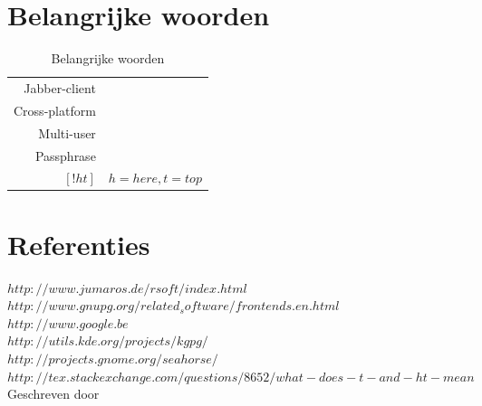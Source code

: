 \documentclass[12pt]{article}
\begin{document}
		\section{Belangrijke woorden}\label{Belangrijke woorden}
			\begin{table}[!ht]
				\begin{center}
					\begin{tabular}{r|l}
						Jabber-client		&	\\
						Cross-platform		&	\\
						Multi-user			&	\\
						Passphrase			&	\\
						$[!ht]$				&	$h=here, t=top$\\
					\end{tabular}
				\end{center}
				\caption{Belangrijke woorden}
			\end{table}

		\newpage
		\section{Referenties}\label{Referenties}
			$http://www.jumaros.de/rsoft/index.html$ \\
			$http://www.gnupg.org/related_software/frontends.en.html$ \\
			$http://www.google.be$\\
			$http://utils.kde.org/projects/kgpg/$\\
			$http://projects.gnome.org/seahorse/$\\
			$http://tex.stackexchange.com/questions/8652/what-does-t-and-ht-mean$\\
					
	Geschreven door ~\cite{Chari01}
	{}
	
\end{document}
